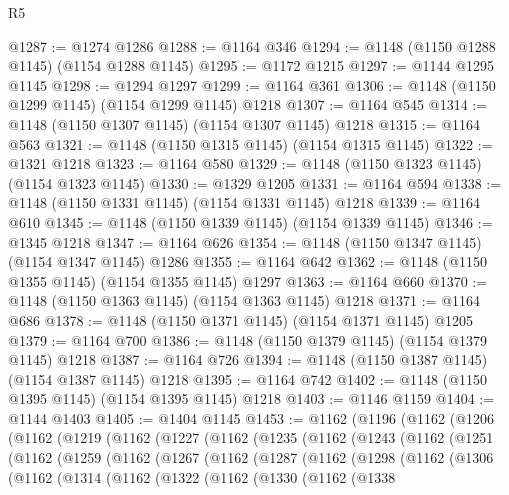 \begin{lexlean}{R5}
\begin{coremodule}
@1287 := @1274 @1286
@1288 := @1164 @346
@1294 := @1148 (@1150 @1288 @1145) (@1154 @1288 @1145)
@1295 := @1172 @1215
@1297 := @1144 @1295 @1145
@1298 := @1294 @1297
@1299 := @1164 @361
@1306 := @1148 (@1150 @1299 @1145) (@1154 @1299 @1145) @1218
@1307 := @1164 @545
@1314 := @1148 (@1150 @1307 @1145) (@1154 @1307 @1145) @1218
@1315 := @1164 @563
@1321 := @1148 (@1150 @1315 @1145) (@1154 @1315 @1145)
@1322 := @1321 @1218
@1323 := @1164 @580
@1329 := @1148 (@1150 @1323 @1145) (@1154 @1323 @1145)
@1330 := @1329 @1205
@1331 := @1164 @594
@1338 := @1148 (@1150 @1331 @1145) (@1154 @1331 @1145) @1218
@1339 := @1164 @610
@1345 := @1148 (@1150 @1339 @1145) (@1154 @1339 @1145)
@1346 := @1345 @1218
@1347 := @1164 @626
@1354 := @1148 (@1150 @1347 @1145) (@1154 @1347 @1145) @1286
@1355 := @1164 @642
@1362 := @1148 (@1150 @1355 @1145) (@1154 @1355 @1145) @1297
@1363 := @1164 @660
@1370 := @1148 (@1150 @1363 @1145) (@1154 @1363 @1145) @1218
@1371 := @1164 @686
@1378 := @1148 (@1150 @1371 @1145) (@1154 @1371 @1145) @1205
@1379 := @1164 @700
@1386 := @1148 (@1150 @1379 @1145) (@1154 @1379 @1145) @1218
@1387 := @1164 @726
@1394 := @1148 (@1150 @1387 @1145) (@1154 @1387 @1145) @1218
@1395 := @1164 @742
@1402 := @1148 (@1150 @1395 @1145) (@1154 @1395 @1145) @1218
@1403 := @1146 @1159
@1404 := @1144 @1403
@1405 := @1404 @1145
@1453 := @1162
    (@1196
      (@1162
        (@1206
          (@1162
            (@1219
              (@1162
                (@1227
                  (@1162
                    (@1235
                      (@1162
                        (@1243
                          (@1162
                            (@1251
                              (@1162
                                (@1259
                                  (@1162
                                    (@1267
                                      (@1162
                                        (@1287
                                          (@1162
                                            (@1298
                                              (@1162
                                                (@1306
                                                  (@1162
                                                    (@1314
                                                      (@1162
                                                        (@1322
                                                          (@1162
                                                            (@1330
                                                              (@1162
                                                                (@1338

\end{coremodule}
\end{lexlean}
